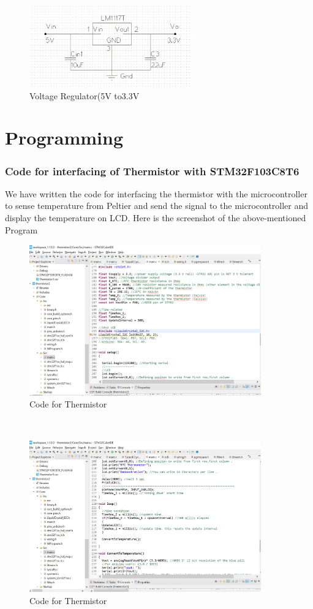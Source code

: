 \documentclass{article}
\begin{document}
\begin{figure}[h]
    \centering
    \includegraphics[width=7cm]{Voltage regulator.jpeg}
    \caption{Voltage Regulator(5V to3.3V}
    \label{fig:galaxy}
\end{figure}

\pagebreak

\section{Programming}

\subsubsection{Code for interfacing of \textbf{Thermistor} with \textbf{STM32F103C8T6}}
We have written the code for interfacing the thermistor with the microcontroller to sense temperature from Peltier and send the signal to the microcontroller and display the temperature on LCD.
Here is the screenshot of the above-mentioned Program


\begin{figure}[h]
    \centering
    \includegraphics[width=10cm]{Code1.png}
    \caption{Code for Thermistor}
    \label{fig:galaxy}
\end{figure}\\

\begin{figure}[h]
    \centering
    \includegraphics[width=10cm]{Code2.png}
    \caption{Code for Thermistor}
    \label{fig:galaxy}
\end{figure}\\
\end{document}
